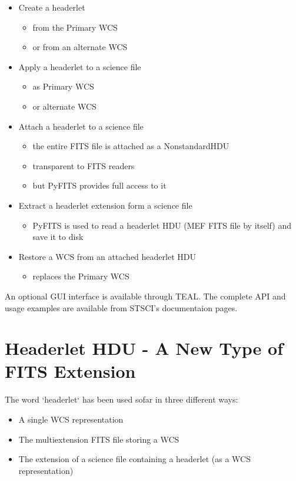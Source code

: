 \documentclass[11pt,twoside]{article}
\begin{document}
\begin{itemize}
\item Create a headerlet
\begin{itemize}
  \item from the Primary WCS
  \item or from an alternate WCS
\end{itemize}
\item Apply a headerlet to a science file
\begin{itemize}
  \item as Primary WCS
  \item or alternate WCS
\end{itemize}
\item Attach a headerlet to a science file
\begin{itemize}
  \item the entire FITS file is attached as a NonstandardHDU
  \item transparent to FITS readers
  \item but PyFITS provides full access to it
\end{itemize}
\item Extract a headerlet extension form a science file
\begin{itemize}
  \item PyFITS is used to read a headerlet HDU (MEF FITS file by itself) and save it to disk
\end{itemize}
\item Restore a WCS from an attached headerlet HDU
\begin{itemize}
  \item replaces the Primary WCS
\end{itemize}
\end{itemize}

An optional GUI interface is available through TEAL.
The complete API and usage examples are available from STSCI's documentaion pages.

\section{Headerlet HDU - A New Type of FITS Extension}
The word `headerlet` has been used sofar in three different ways:

\begin{itemize}
\item A single WCS representation
\item The multiextension FITS file storing a WCS
\item The extension of a science file containing a headerlet (as a WCS representation)
\end{itemize}
\end{document}
